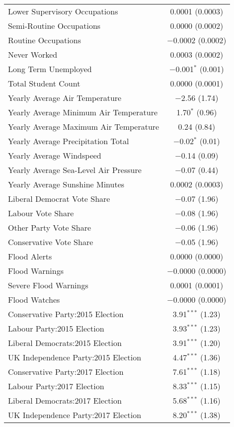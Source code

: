\documentclass[12pt,letterpaper]{article}
\begin{document}
\begin{table}[H]
\begin{tabular}{@{\extracolsep{5pt}}lc}
		Lower Supervisory Occupations & 0.0001 (0.0003) \\ 
		Semi-Routine Occupations & 0.0000 (0.0002) \\ 
		Routine Occupations & $-$0.0002 (0.0002) \\ 
		Never Worked & 0.0003 (0.0002) \\ 
		Long Term Unemployed & $-$0.001$^{*}$ (0.001) \\ 
		Total Student Count & 0.0000 (0.0001) \\ 
		Yearly Average Air Temperature & $-$2.56 (1.74) \\ 
		Yearly Average Minimum Air Temperature & 1.70$^{*}$ (0.96) \\ 
		Yearly Average Maximum Air Temperature & 0.24 (0.84) \\ 
		Yearly Average Precipitation Total & $-$0.02$^{*}$ (0.01) \\ 
		Yearly Average Windspeed & $-$0.14 (0.09) \\ 
		Yearly Average  Sea-Level Air Pressure & $-$0.07 (0.44) \\ 
		Yearly Average Sunshine Minutes & 0.0002 (0.0003) \\ 
		Liberal Democrat Vote Share & $-$0.07 (1.96) \\ 
		Labour Vote Share & $-$0.08 (1.96) \\ 
		Other Party Vote Share & $-$0.06 (1.96) \\ 
		Conservative Vote Share & $-$0.05 (1.96) \\ 
		Flood Alerts & 0.0000 (0.0000) \\ 
		Flood Warnings & $-$0.0000 (0.0000) \\ 
		Severe Flood Warnings & 0.0001 (0.0001) \\ 
		Flood Watches & $-$0.0000 (0.0000) \\ 
		Conservative Party:2015 Election & 3.91$^{***}$ (1.23) \\ 
		Labour Party:2015 Election& 3.93$^{***}$ (1.23) \\ 
		Liberal Democrats:2015 Election & 3.91$^{***}$ (1.20) \\ 
		UK Independence Party:2015 Election & 4.47$^{***}$ (1.36) \\ 
		Conservative Party:2017 Election & 7.61$^{***}$ (1.18) \\ 
		Labour Party:2017 Election & 8.33$^{***}$ (1.15) \\ 
		Liberal Democrats:2017 Election & 5.68$^{***}$ (1.16) \\ 
		UK Independence Party:2017 Election & 8.20$^{***}$ (1.38) \\ 

\end{tabular}
\end{table}
\end{document}
